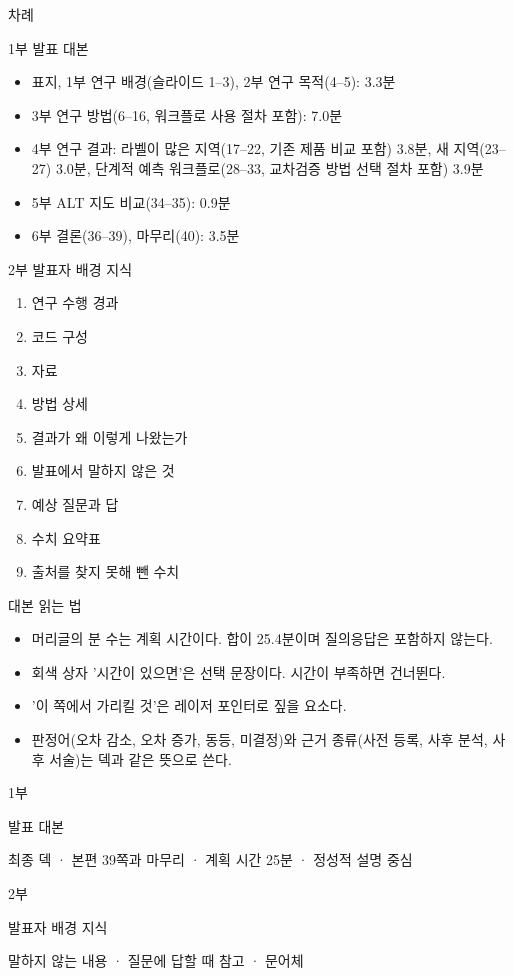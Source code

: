 \documentclass[11pt,a4paper]{article}
\newcommand{\partpage}[3]{%
  \clearpage\thispagestyle{empty}
  \vspace*{0.30\textheight}
  {\noindent\color{accent}\semibold\cjksemibold\Huge #1\par}
  \vspace{1.2em}
  {\noindent\semibold\cjksemibold\Large #2\par}
  \vspace{1.2em}
  {\noindent\color{textgray}#3\par}
  \clearpage}
\begin{document}
\thispagestyle{plain}
{\noindent\semibold\cjksemibold\Large 차례\par}
\vspace{0.6em}
{\noindent\semibold\cjksemibold 1부 발표 대본\par}
\begin{itemize}[leftmargin=1.4em, itemsep=0.1em]
  \item 표지, 1부 연구 배경(슬라이드 1–3), 2부 연구 목적(4–5): 3.3분
  \item 3부 연구 방법(6–16, 워크플로 사용 절차 포함): 7.0분
  \item 4부 연구 결과: 라벨이 많은 지역(17–22, 기존 제품 비교 포함) 3.8분, 새 지역(23–27) 3.0분, 단계적 예측 워크플로(28–33, 교차검증 방법 선택 절차 포함) 3.9분
  \item 5부 ALT 지도 비교(34–35): 0.9분
  \item 6부 결론(36–39), 마무리(40): 3.5분
\end{itemize}
{\noindent\semibold\cjksemibold 2부 발표자 배경 지식\par}
\begin{enumerate}[leftmargin=1.8em, itemsep=0.1em]
  \item 연구 수행 경과
  \item 코드 구성
  \item 자료
  \item 방법 상세
  \item 결과가 왜 이렇게 나왔는가
  \item 발표에서 말하지 않은 것
  \item 예상 질문과 답
  \item 수치 요약표
  \item 출처를 찾지 못해 뺀 수치
\end{enumerate}

\vspace{1em}
{\noindent\semibold\cjksemibold 대본 읽는 법\par}
\begin{itemize}[leftmargin=1.4em, itemsep=0.1em]
  \item 머리글의 분 수는 계획 시간이다. 합이 25.4분이며 질의응답은 포함하지 않는다.
  \item 회색 상자 '시간이 있으면'은 선택 문장이다. 시간이 부족하면 건너뛴다.
  \item '이 쪽에서 가리킬 것'은 레이저 포인터로 짚을 요소다.
  \item 판정어(오차 감소, 오차 증가, 동등, 미결정)와 근거 종류(사전 등록, 사후 분석, 사후 서술)는 덱과 같은 뜻으로 쓴다.
\end{itemize}

\partpage{1부}{발표 대본}{최종 덱 · 본편 39쪽과 마무리 · 계획 시간 25분 · 정성적 설명 중심}


\partpage{2부}{발표자 배경 지식}{말하지 않는 내용 · 질문에 답할 때 참고 · 문어체}

\end{document}
